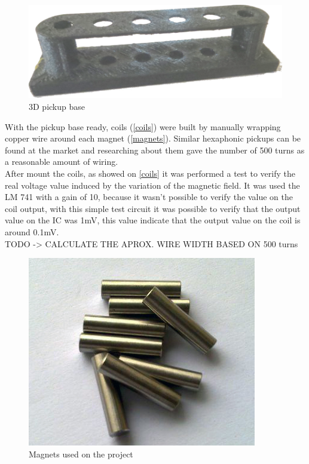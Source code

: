 \begin{figure}[!htpb]
\centering
\caption{3D pickup base}
\label{3D-base}
\includegraphics[scale=0.08]{images/base}
\end{figure}

With the pickup base ready, coils (\autoref{coils}) were built by manually wrapping copper wire around
each magnet (\autoref{magnets}). Similar hexaphonic pickups can be found at the
market and researching about them gave the number of 500 turns as a reasonable amount
of wiring. \\

After mount the coils, as showed on \autoref{coils} it was performed a test to verify the real voltage value induced by
the variation of the magnetic field. It was used the LM 741 \cite{LM741} with a gain of 10,
because it wasn't possible to verify the value on the coil output, with this simple test circuit
it was possible to verify that the output value on the IC was 1mV, this value indicate that the
output value on the coil is around 0.1mV. \\

TODO -> CALCULATE THE APROX. WIRE WIDTH BASED ON 500 turns\\

\begin{figure}[!htpb]
  \centering
  \caption{Magnets used on the project}
  \label{magnets}
  \includegraphics[scale=0.3]{images/magnets}
\end{figure}

